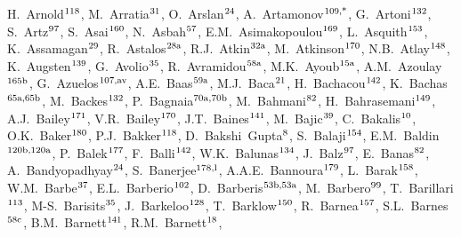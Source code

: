 \begin{flushleft}
H.~Arnold$^\textrm{\scriptsize 118}$,    
M.~Arratia$^\textrm{\scriptsize 31}$,    
O.~Arslan$^\textrm{\scriptsize 24}$,    
A.~Artamonov$^\textrm{\scriptsize 109,*}$,    
G.~Artoni$^\textrm{\scriptsize 132}$,    
S.~Artz$^\textrm{\scriptsize 97}$,    
S.~Asai$^\textrm{\scriptsize 160}$,    
N.~Asbah$^\textrm{\scriptsize 57}$,    
E.M.~Asimakopoulou$^\textrm{\scriptsize 169}$,    
L.~Asquith$^\textrm{\scriptsize 153}$,    
K.~Assamagan$^\textrm{\scriptsize 29}$,    
R.~Astalos$^\textrm{\scriptsize 28a}$,    
R.J.~Atkin$^\textrm{\scriptsize 32a}$,    
M.~Atkinson$^\textrm{\scriptsize 170}$,    
N.B.~Atlay$^\textrm{\scriptsize 148}$,    
K.~Augsten$^\textrm{\scriptsize 139}$,    
G.~Avolio$^\textrm{\scriptsize 35}$,    
R.~Avramidou$^\textrm{\scriptsize 58a}$,    
M.K.~Ayoub$^\textrm{\scriptsize 15a}$,    
A.M.~Azoulay$^\textrm{\scriptsize 165b}$,    
G.~Azuelos$^\textrm{\scriptsize 107,av}$,    
A.E.~Baas$^\textrm{\scriptsize 59a}$,    
M.J.~Baca$^\textrm{\scriptsize 21}$,    
H.~Bachacou$^\textrm{\scriptsize 142}$,    
K.~Bachas$^\textrm{\scriptsize 65a,65b}$,    
M.~Backes$^\textrm{\scriptsize 132}$,    
P.~Bagnaia$^\textrm{\scriptsize 70a,70b}$,    
M.~Bahmani$^\textrm{\scriptsize 82}$,    
H.~Bahrasemani$^\textrm{\scriptsize 149}$,    
A.J.~Bailey$^\textrm{\scriptsize 171}$,    
V.R.~Bailey$^\textrm{\scriptsize 170}$,    
J.T.~Baines$^\textrm{\scriptsize 141}$,    
M.~Bajic$^\textrm{\scriptsize 39}$,    
C.~Bakalis$^\textrm{\scriptsize 10}$,    
O.K.~Baker$^\textrm{\scriptsize 180}$,    
P.J.~Bakker$^\textrm{\scriptsize 118}$,    
D.~Bakshi~Gupta$^\textrm{\scriptsize 8}$,    
S.~Balaji$^\textrm{\scriptsize 154}$,    
E.M.~Baldin$^\textrm{\scriptsize 120b,120a}$,    
P.~Balek$^\textrm{\scriptsize 177}$,    
F.~Balli$^\textrm{\scriptsize 142}$,    
W.K.~Balunas$^\textrm{\scriptsize 134}$,    
J.~Balz$^\textrm{\scriptsize 97}$,    
E.~Banas$^\textrm{\scriptsize 82}$,    
A.~Bandyopadhyay$^\textrm{\scriptsize 24}$,    
S.~Banerjee$^\textrm{\scriptsize 178,l}$,    
A.A.E.~Bannoura$^\textrm{\scriptsize 179}$,    
L.~Barak$^\textrm{\scriptsize 158}$,    
W.M.~Barbe$^\textrm{\scriptsize 37}$,    
E.L.~Barberio$^\textrm{\scriptsize 102}$,    
D.~Barberis$^\textrm{\scriptsize 53b,53a}$,    
M.~Barbero$^\textrm{\scriptsize 99}$,    
T.~Barillari$^\textrm{\scriptsize 113}$,    
M-S.~Barisits$^\textrm{\scriptsize 35}$,    
J.~Barkeloo$^\textrm{\scriptsize 128}$,    
T.~Barklow$^\textrm{\scriptsize 150}$,    
R.~Barnea$^\textrm{\scriptsize 157}$,    
S.L.~Barnes$^\textrm{\scriptsize 58c}$,    
B.M.~Barnett$^\textrm{\scriptsize 141}$,    
R.M.~Barnett$^\textrm{\scriptsize 18}$,    

\end{flushleft}
